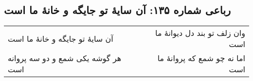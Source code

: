 \begin{center}
\section*{رباعی شماره ۱۳۵: آن سایهٔ تو جایگه و خانهٔ ما است}
\label{sec:0135}
\begin{longtable}{l p{0.5cm} r}
آن سایهٔ تو جایگه و خانهٔ ما است
&&
وان زلف تو بند دل دیوانهٔ ما است
\\
هر گوشه یکی شمع و دو سه پروانه است
&&
اما نه چو شمع که پروانهٔ ما است
\\
\end{longtable}
\end{center}
